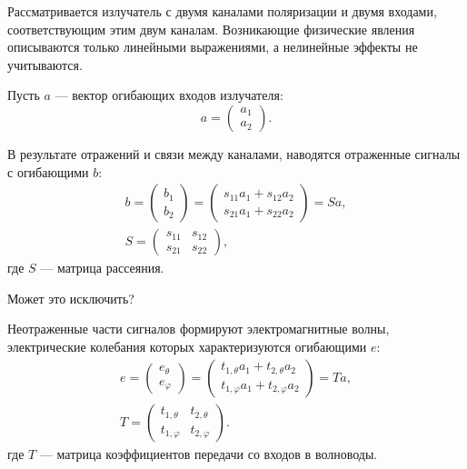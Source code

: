 Рассматривается излучатель с двумя каналами поляризации и двумя входами, соответствующим этим двум каналам. Возникающие физические явления описываются только
линейными выражениями, а нелинейные эффекты не учитываются.

Пусть $a$ --- вектор огибающих входов излучателя:
\[
    a
    = \begin{pmatrix}
          a_1 \\
          a_2
    \end{pmatrix} .
\]

В результате отражений и связи между каналами, наводятся отраженные сигналы с огибающими $b$:
\begin{gather*}
    b
    = \begin{pmatrix}
          b_1 \\
          b_2
    \end{pmatrix}
    = \begin{pmatrix}
          s_{11} a_1 + s_{12} a_2 \\
          s_{21} a_1 + s_{22} a_2
    \end{pmatrix}
    = S a, \\
    S
    = \begin{pmatrix}
          s_{11} & s_{12} \\
          s_{21} & s_{22}
    \end{pmatrix},
\end{gather*}
где $S$ --- матрица рассеяния.

        {
    \color{red}
    Может это исключить?

    Неотраженные части сигналов формируют электромагнитные волны, электрические колебания которых характеризуются огибающими $e$:
    \begin{gather*}
        e
        = \begin{pmatrix}
              e_\theta \\
              e_\varphi
        \end{pmatrix}
        = \begin{pmatrix}
              t_{1, \theta} a_1 + t_{2, \theta} a_2 \\
              t_{1, \varphi} a_1 + t_{2, \varphi} a_2
        \end{pmatrix}
        = T a, \\
        T
        = \begin{pmatrix}
              t_{1, \theta}  & t_{2, \theta}  \\
              t_{1, \varphi} & t_{2, \varphi}
        \end{pmatrix} .
    \end{gather*}
    где $T$ --- матрица коэффициентов передачи со входов в волноводы.
}

